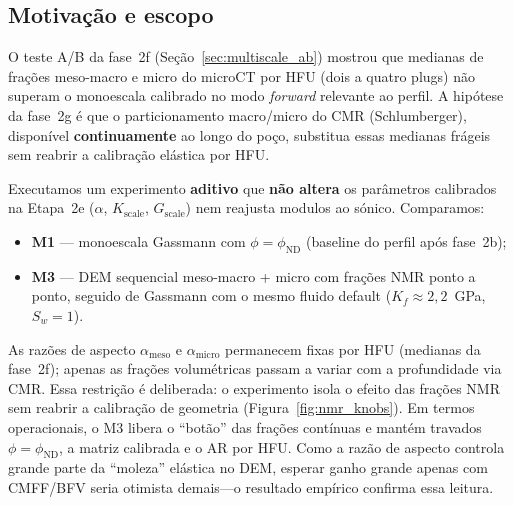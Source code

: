 \documentclass[11pt,a4paper]{article}
\numberwithin{equation}{section}
\newcommand{\phiND}{\ensuremath{\phi_{\mathrm{ND}}}}
\begin{document}
\subsection{Motivação e escopo}

O teste A/B da fase~2f (Seção~\ref{sec:multiscale_ab}) mostrou que medianas de
frações meso-macro e micro do microCT por HFU (dois a quatro plugs) não
superam o monoescala calibrado no modo \emph{forward} relevante ao perfil.
A hipótese da fase~2g é que o particionamento macro/micro do CMR
(Schlumberger), disponível \textbf{continuamente} ao longo do poço, substitua
essas medianas frágeis sem reabrir a calibração elástica por HFU.

Executamos um experimento \textbf{aditivo} que \textbf{não altera} os parâmetros
calibrados na Etapa~2e ($\alpha$, $K_{\mathrm{scale}}$, $G_{\mathrm{scale}}$)
nem reajusta modulos ao sónico.
Comparamos:
\begin{itemize}
  \item \textbf{M1} --- monoescala Gassmann com $\phi = \phiND{}$ (baseline do
        perfil após fase~2b);
  \item \textbf{M3} --- DEM sequencial meso-macro + micro com frações NMR
        ponto a ponto, seguido de Gassmann com o mesmo fluido default
        ($K_f \approx 2{,}2$~GPa, $S_w = 1$).
\end{itemize}
As razões de aspecto $\alpha_{\mathrm{meso}}$ e $\alpha_{\mathrm{micro}}$
permanecem fixas por HFU (medianas da fase~2f); apenas as frações volumétricas
passam a variar com a profundidade via CMR.
Essa restrição é deliberada: o experimento isola o efeito das frações NMR
sem reabrir a calibração de geometria (Figura~\ref{fig:nmr_knobs}).
Em termos operacionais, o M3 libera o ``botão'' das frações contínuas e
mantém travados $\phi=\phiND{}$, a matriz calibrada e o AR por HFU.
Como a razão de aspecto controla grande parte da ``moleza'' elástica no
DEM, esperar ganho grande apenas com CMFF/BFV seria otimista demais---o
resultado empírico confirma essa leitura.
\end{document}
